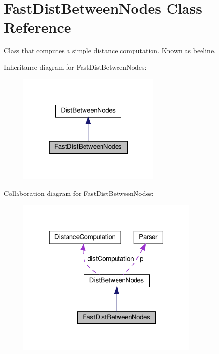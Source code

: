 \hypertarget{classFastDistBetweenNodes}{}\section{Fast\+Dist\+Between\+Nodes Class Reference}
\label{classFastDistBetweenNodes}


Class that computes a simple distance computation. Known as beeline.  




Inheritance diagram for Fast\+Dist\+Between\+Nodes\+:\nopagebreak
\begin{figure}[H]
\begin{center}
\leavevmode
\includegraphics[width=201pt]{classFastDistBetweenNodes__inherit__graph}
\end{center}
\end{figure}


Collaboration diagram for Fast\+Dist\+Between\+Nodes\+:\nopagebreak
\begin{figure}[H]
\begin{center}
\leavevmode
\includegraphics[width=256pt]{classFastDistBetweenNodes__coll__graph}
\end{center}
\end{figure}
